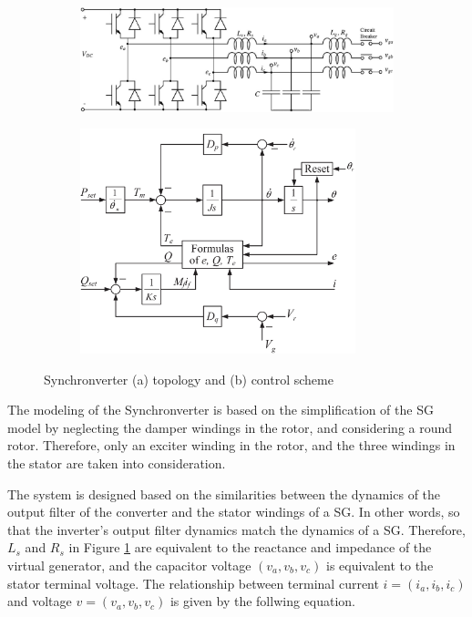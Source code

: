 \begin{figure}[ht!]
    \centering
    \begin{subfigure}[b]{\textwidth}
        \centering
        \includegraphics[width=12cm]{images/synchronverter_topology.png}
        \caption{}
        \label{fig:synchronverter_topology}
    \end{subfigure}

    \begin{subfigure}[b]{\textwidth}
        \centering
        \includegraphics[width=8cm]{images/synchronverter_control.png}
        \caption{}
        \label{fig:synchronverter_control}
    \end{subfigure}
    \label{fig:synchronverter}
    \caption{Synchronverter (a) topology and (b) control scheme \cite{zhong2014self}}
\end{figure}

The modeling of the Synchronverter is based on the simplification of the SG
model by neglecting the damper windings in the rotor, and considering a round
rotor. Therefore, only an exciter winding in the rotor, and the three windings
in the stator are taken into consideration.

The system is designed based on the similarities between the dynamics of the
output filter of the converter and the stator windings of a SG. In other words,
so that the inverter's output filter dynamics match the dynamics of a SG.
Therefore, $L_s$ and $R_s$ in Figure \ref{fig:synchronverter_topology} are
equivalent to the reactance and impedance of the virtual generator, and the
capacitor voltage $(v_a, v_b, v_c)$ is equivalent to the stator terminal
voltage. The relationship between terminal current $i = (i_a, i_b, i_c)$ and
voltage $v = (v_a, v_b, v_c)$ is given by the follwing equation.

